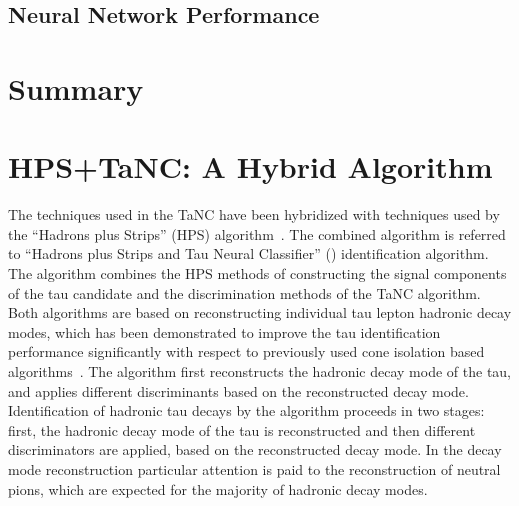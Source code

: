 \subsection{Neural Network Performance}
\label{sec:NeuralNetworkPerformance}

\section{Summary}


\section{HPS+TaNC: A Hybrid Algorithm}
\label{sec:TauId} 
%
The techniques used in the TaNC have been hybridized with techniques used by the
``Hadrons plus Strips'' (HPS) algorithm~\cite{CMS_AN_2010-082}.  The combined
algorithm is referred to ``Hadrons plus Strips and Tau Neural Classifier''
(\hpsTanc) identification algorithm.  The algorithm combines the HPS methods of
constructing the signal components of the tau candidate and the discrimination
methods of the TaNC algorithm.  Both algorithms are based on reconstructing
individual tau lepton hadronic decay modes, which has been demonstrated to
improve the tau identification performance significantly with respect to
previously used cone isolation based algorithms~\cite{CMS-PAS-PFT-10-004}.  The
\hpsTanc algorithm first reconstructs the hadronic decay mode of the tau, and
applies different discriminants based on the reconstructed decay mode.
Identification of hadronic tau decays by the \hpsTanc algorithm proceeds in two
stages: first, the hadronic decay mode of the tau is reconstructed and then
different discriminators are applied, based on the reconstructed decay mode.  In
the decay mode reconstruction particular attention is paid to the reconstruction
of neutral pions, which are expected for the majority of hadronic decay modes.

